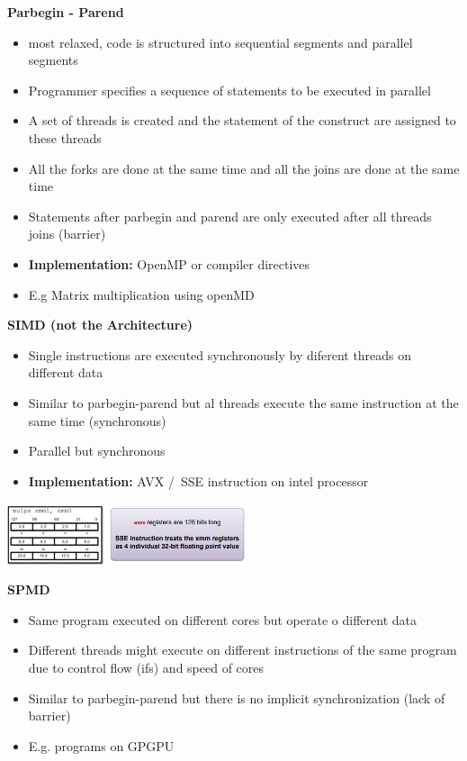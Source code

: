 \documentclass[10pt, landscape]{article}
\begin{document}
\begin{multicols}{4}
\textbf{Parbegin - Parend}
\begin{itemize}
    \item most relaxed, code is structured into sequential segments and parallel segments
    \item Programmer specifies a sequence of statements to be executed in parallel 
    \item A set of threads is created and the statement of the construct are assigned to these threads 
    \item All the forks are done at the same time and all the joins are done at the same time 
    \item Statements after parbegin and parend are only executed after all threads joins (barrier)
    \item \textbf{Implementation: } OpenMP or compiler directives 
    \item E.g Matrix multiplication using openMD
\end{itemize}

\textbf{SIMD (not the Architecture)}
\begin{itemize}
    \item Single instructions are executed synchronously by diferent threads on different data 
    \item Similar to parbegin-parend but al threads execute the same instruction at the same time (synchronous)
    \item Parallel but synchronous
    \item \textbf{Implementation: } AVX /\ SSE instruction on intel processor
\end{itemize}
\includegraphics*[width=7cm]{simd}

\textbf{SPMD}
\begin{itemize}
    \item Same program executed on different cores but operate o different data  
    \item Different threads might execute on different instructions of the same program due to control flow (ifs) and speed of cores
    \item Similar to parbegin-parend but there is no implicit synchronization (lack of barrier)
    \item E.g. programs on GPGPU
\end{itemize}


\end{multicols}
\end{document}
